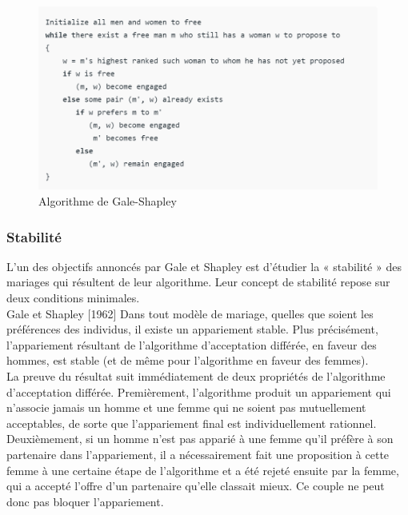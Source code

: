 \begin{figure}[h!]
	\center
	\includegraphics[scale=0.7]{img/algo.png}
	\caption{Algorithme de Gale-Shapley }
	
\end{figure}


\subsubsection{Stabilité}
 \par L’un des objectifs annoncés par Gale et Shapley est d’étudier la « stabilité » des mariages qui résultent de leur algorithme. Leur concept de stabilité repose sur deux conditions minimales.
 \\
 Gale et Shapley [1962] Dans tout modèle de mariage, quelles que soient les préférences des individus, il existe un appariement stable. Plus précisément, l’appariement résultant de l’algorithme d’acceptation différée, en faveur des hommes, est stable (et de même pour l’algorithme en faveur des femmes).
 \\
La preuve du résultat suit immédiatement de deux propriétés de l’algorithme d’acceptation différée. Premièrement, l’algorithme produit un appariement qui n’associe jamais un homme et une femme qui ne soient pas mutuellement acceptables, de sorte que l’appariement final est individuellement rationnel. Deuxièmement, si un homme n’est pas apparié à une femme qu’il préfère à son partenaire dans l’appariement, il a nécessairement fait une proposition à cette femme à une certaine étape de l’algorithme et a été rejeté ensuite par la femme, qui a accepté l’offre d’un partenaire qu’elle classait mieux. Ce couple ne peut donc pas bloquer l’appariement. 
